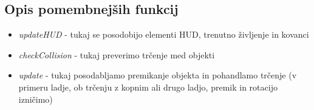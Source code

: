 \documentclass[a4paper]{article}
\begin{document}
\subsection{Opis pomembnejših funkcij}

\begin{itemize}
\item \textit{updateHUD} - tukaj se posodobijo elementi HUD, trenutno življenje in kovanci
\item \textit{checkCollision} - tukaj preverimo trčenje med objekti
\item \textit{update} - tukaj posodabljamo premikanje objekta in pohandlamo trčenje (v primeru ladje, ob trčenju z kopnim ali drugo ladjo, premik in rotacijo izničimo)
\end{itemize}



\small


\end{document}
